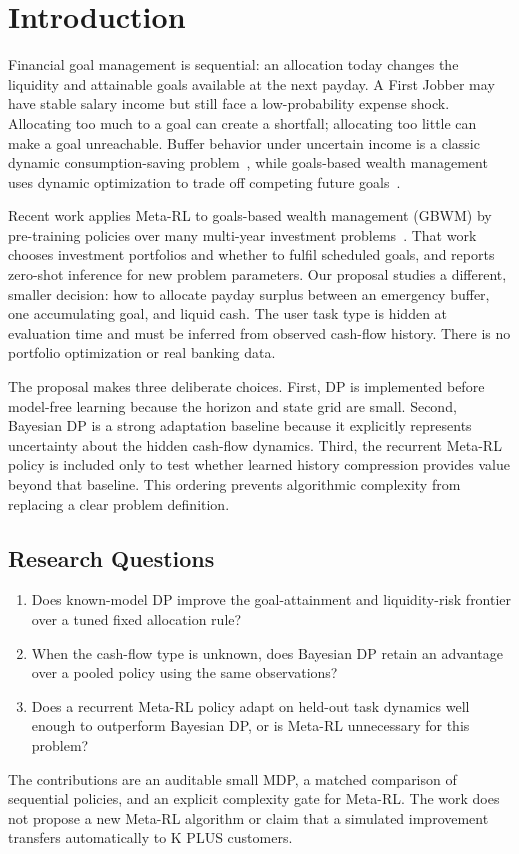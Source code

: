 \section{Introduction}\label{sec:introduction}

Financial goal management is sequential: an allocation today changes the liquidity and attainable goals available at the next payday. A First Jobber may have stable salary income but still face a low-probability expense shock. Allocating too much to a goal can create a shortfall; allocating too little can make a goal unreachable. Buffer behavior under uncertain income is a classic dynamic consumption-saving problem~\cite{deaton}, while goals-based wealth management uses dynamic optimization to trade off competing future goals~\cite{dasdp}.

Recent work applies Meta-RL to goals-based wealth management (GBWM) by pre-training policies over many multi-year investment problems~\cite{dasmeta}. That work chooses investment portfolios and whether to fulfil scheduled goals, and reports zero-shot inference for new problem parameters. Our proposal studies a different, smaller decision: how to allocate payday surplus between an emergency buffer, one accumulating goal, and liquid cash. The user task type is hidden at evaluation time and must be inferred from observed cash-flow history. There is no portfolio optimization or real banking data.

The proposal makes three deliberate choices. First, DP is implemented before model-free learning because the horizon and state grid are small. Second, Bayesian DP is a strong adaptation baseline because it explicitly represents uncertainty about the hidden cash-flow dynamics. Third, the recurrent Meta-RL policy is included only to test whether learned history compression provides value beyond that baseline. This ordering prevents algorithmic complexity from replacing a clear problem definition.

\subsection{Research Questions}
\begin{enumerate}[noitemsep,topsep=2pt]
    \item Does known-model DP improve the goal-attainment and liquidity-risk frontier over a tuned fixed allocation rule?
    \item When the cash-flow type is unknown, does Bayesian DP retain an advantage over a pooled policy using the same observations?
    \item Does a recurrent Meta-RL policy adapt on held-out task dynamics well enough to outperform Bayesian DP, or is Meta-RL unnecessary for this problem?
\end{enumerate}

The contributions are an auditable small MDP, a matched comparison of sequential policies, and an explicit complexity gate for Meta-RL. The work does not propose a new Meta-RL algorithm or claim that a simulated improvement transfers automatically to K PLUS customers.

